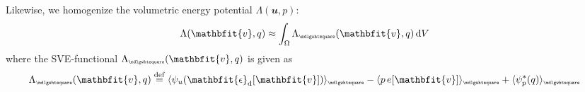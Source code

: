 \documentclass[12pt,a4paper]{article}
\renewcommand{\ta}[1]{\mathbfit{#1}}
\renewcommand{\ts}[1]{\mathbfit{#1}}
\renewcommand{\Box}{\mdlgwhtsquare}
\DeclarePairedDelimiter{\homgen}{\langle}{\rangle_\rve}
\renewcommand{\dev}{\mathrm{d}}
\newcommand{\rve}{
  {\mathchoice
   {\mbox{\scalebox{0.67}{$\Box$}}}
   {\mbox{\scalebox{0.67}{$\Box$}}}
   {\mbox{\scalebox{0.5}{$\Box$}}}
   {\mbox{\scalebox{0.375}{$\Box$}}}
  }
}
\begin{document}
Likewise, we homogenize the volumetric energy potential $\Lambda(\ta{u},p)$:
\begin{align}
    \Lambda(\ta{v},q) &\approx \int_\Omega \Lambda_\rve(\ta{v},q) \dif V
\label{eq222}
\end{align}
where the SVE-functional $\Lambda_\rve(\ta{v},q)$ is given as
\begin{align}
    \Lambda_\rve(\ta{v},q) &\defeq
    \homgen{ \psi_u(\ts{\epsilon}_\dev[\ta{v}])} -
    \homgen{  p\,e[\ta{v}] } + \homgen{ \psi_p^*(q) }
\label{eq123}
\end{align}
\end{document}
